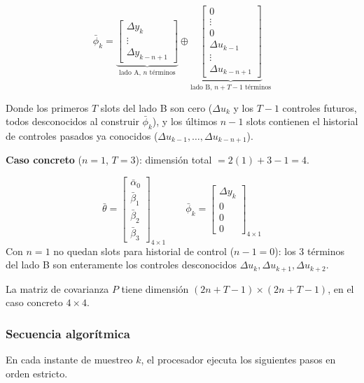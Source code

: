 \[
    \bar{\phi}_k =
    \underbrace{\begin{bmatrix}
        \Delta y_k \\ \vdots \\ \Delta y_{k-n+1}
    \end{bmatrix}}_{\text{lado A, }n\text{ términos}}
    \oplus
    \underbrace{\begin{bmatrix}
        0 \\ \vdots \\ 0 \\ \Delta u_{k-1} \\ \vdots \\ \Delta u_{k-n+1}
    \end{bmatrix}}_{\text{lado B, }n+T-1\text{ términos}}
\]

Donde los primeros $T$ slots del lado B son cero ($\Delta u_k$ y los $T-1$ controles futuros, todos desconocidos al construir $\bar\phi_k$), y los últimos $n-1$ slots contienen el historial de controles pasados ya conocidos ($\Delta u_{k-1}, \ldots, \Delta u_{k-n+1}$).

\textbf{Caso concreto} ($n=1$, $T=3$): dimensión total $= 2(1)+3-1 = 4$.

\[
    \bar{\theta} = \begin{bmatrix} \bar{\alpha}_0 \\ \bar{\beta}_1 \\ \bar{\beta}_2 \\ \bar{\beta}_3 \end{bmatrix}_{4\times1}
    \qquad
    \bar{\phi}_k = \begin{bmatrix} \Delta y_k \\ 0 \\ 0 \\ 0 \end{bmatrix}_{4\times1}
\]
Con $n=1$ no quedan slots para historial de control ($n-1=0$): los 3 términos del lado B son enteramente los controles desconocidos $\Delta u_k, \Delta u_{k+1}, \Delta u_{k+2}$.

La matriz de covarianza $P$ tiene dimensión $(2n+T-1)\times(2n+T-1)$, en el caso concreto $4\times4$.

\clearpage
\subsubsection*{Secuencia algorítmica}

En cada instante de muestreo $k$, el procesador ejecuta los siguientes pasos en orden estricto.

